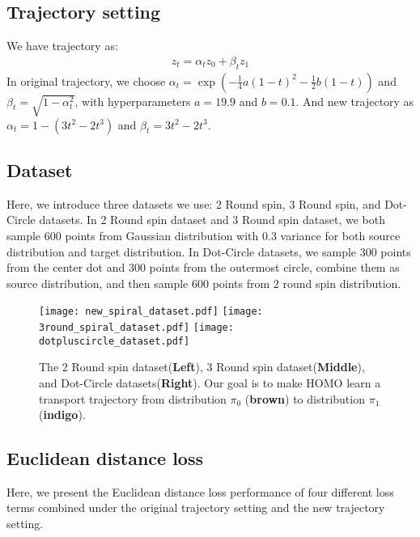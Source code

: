 \subsection{Trajectory setting}\label{sec:app:trajectory_setting}
We have trajectory as:
\begin{align*}
    z_t = \alpha_t z_0 + \beta_t z_1
\end{align*}
In original trajectory, we choose $\alpha_t = \exp(-\frac{1}{4} a(1-t)^2 - \frac{1}{2} b(1-t))$ and $\beta_t = \sqrt{1 - \alpha_t^2}$, with hyperparameters $a = 19.9$ and $b = 0.1$. And new trajectory as $\alpha_t = 1 - ( 3t^2 - 2t^3 )$ and $\beta_t = 3t^2 - 2t^3$. 

\subsection{Dataset}\label{sec:app:complex_dataset}
Here, we introduce three datasets we use: 2 Round spin, 3 Round spin, and Dot-Circle datasets. In 2 Round spin dataset and 3 Round spin dataset, we both sample 600 points from Gaussian distribution with $0.3$ variance for both source distribution and target distribution. In Dot-Circle datasets, we sample 300 points from the center dot and 300 points from the outermost circle, combine them as source distribution, and then sample 600 points from 2 round spin distribution. 
\begin{figure}[!ht] 
\centering
\texttt{[image: new\_spiral\_dataset.pdf]}
\texttt{[image: 3round\_spiral\_dataset.pdf]}
\texttt{[image: dotpluscircle\_dataset.pdf]}
\caption{
The 2 Round spin dataset(\textbf{Left}), 3 Round spin dataset(\textbf{Middle}), and Dot-Circle datasets(\textbf{Right}). Our goal is to make HOMO learn a transport trajectory from distribution $\pi_0$ ({\textbf{brown}}) to distribution $\pi_1$ ({\textbf{indigo}}). 
}
\label{fig:three_complex_dataset}
\end{figure}


\subsection{Euclidean distance loss}\label{sec:app:euclidean_distance_loss}
Here, we present the Euclidean distance loss performance of four different loss terms combined under the original trajectory setting and the new trajectory setting. 


